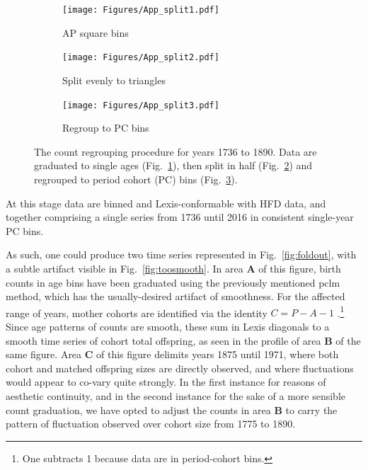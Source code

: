 \documentclass{article}
\begin{document}
\begin{appendix}
\begin{figure}[ht!]
\centering
\begin{subfigure}{.3\textwidth}
  \centering
  \texttt{[image: Figures/App\_split1.pdf]}
  \caption{AP square bins}
  \label{fig:app1}
\end{subfigure}%
\begin{subfigure}{.3\textwidth}
  \centering
  \texttt{[image: Figures/App\_split2.pdf]}
  \caption{Split evenly to triangles}
  \label{fig:app2}
\end{subfigure}
\begin{subfigure}{.3\textwidth}
  \centering
  \texttt{[image: Figures/App\_split3.pdf]}
  \caption{Regroup to PC bins}
  \label{fig:app3}
\end{subfigure}
\caption{The count regrouping procedure for years 1736 to 1890. Data are graduated to single ages (Fig.~\ref{fig:app1}), then split in half (Fig.~\ref{fig:app2}) and regrouped to period cohort (PC) bins (Fig.~\ref{fig:app3}).}
\label{fig:AP2PC}
\end{figure}
At this stage data are binned and Lexis-conformable with HFD data, and together comprising a single series from 1736 until 2016 in consistent single-year PC bins.

As such, one could produce two time series represented in Fig.~\ref{fig:foldout}, with a subtle artifact visible in Fig.~\ref{fig:toosmooth}. In area \textbf{A} of this figure, birth counts in age bins have been graduated using the previously mentioned pclm method, which has the usually-desired artifact of smoothness. For the affected range of years, mother cohorts are identified via the identity $C = P - A - 1$ .\footnote{One subtracts 1 because data are in period-cohort bins.} Since age patterns of counts are smooth, these sum in Lexis diagonals to a smooth time series of cohort total offspring, as seen in the profile of area \textbf{B} of the same figure. Area \textbf{C} of this figure delimits years 1875 until 1971, where both cohort and matched offspring sizes are directly observed, and where fluctuations would appear to co-vary quite strongly. In the first instance for reasons of aesthetic continuity, and in the second instance for the sake of a more sensible count graduation, we have opted to adjust the counts in area \textbf{B} to carry the pattern of fluctuation observed over cohort size from 1775 to 1890.


\end{appendix}
\end{document}
